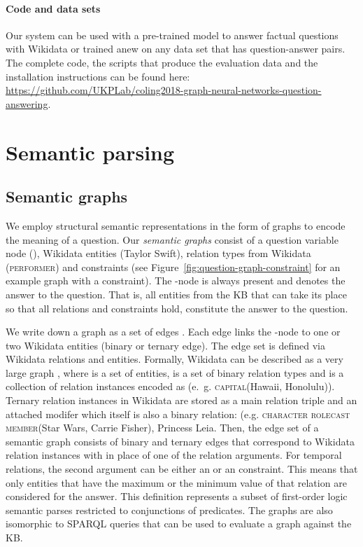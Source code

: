 \documentclass[11pt]{article}
\begin{document}
\paragraph{Code and data sets} 
Our system can be used with a pre-trained model to answer factual questions with Wikidata or trained anew on any data set that has question-answer pairs.
The complete code, the scripts that produce the evaluation data and the installation instructions can be found here: \url{https://github.com/UKPLab/coling2018-graph-neural-networks-question-answering}.


\section{Semantic parsing}

\subsection{Semantic graphs}

We employ structural semantic representations in the form of graphs to encode the meaning of a question. 
Our \textit{semantic graphs} consist of a question variable node (), Wikidata entities ({\small\sffamily Taylor Swift}), relation types from Wikidata (\textsc{performer}) and constraints (see Figure~\ref{fig:question-graph-constraint} for an example graph with a constraint). The -node is always present and denotes the answer to the question. That is, all entities from the KB that can take its place so that all relations and constraints hold, constitute the answer to the question. 

We write down a graph as a set of edges . Each edge links the -node to one or two Wikidata entities (binary or ternary edge). The edge set  is defined via Wikidata relations and entities. Formally, Wikidata can be described as a very large graph , where  is a set of entities,  is a set of binary relation types and  is a collection of relation instances encoded as  (e.~g. \textsc{capital}\hspace{0.1em}({\small\sffamily Hawaii}, {\small\sffamily Honolulu})). Ternary relation instances in Wikidata are stored as a main relation triple and an attached modifer which itself is also a binary relation:  (e.g. \textsc{character role}\hspace{0.1em}\textsc{cast member}\hspace{0.1em}({\small\sffamily Star Wars}, {\small\sffamily Carrie Fisher}), {\small\sffamily Princess Leia}. Then, the edge set  of a semantic graph consists of binary and ternary edges that correspond to Wikidata relation instances with  in place of one of the relation arguments. For temporal relations, the second argument can be either an  or an  constraint. This means that only entities that have the maximum or the minimum value of that relation are considered for the answer.
This definition represents a subset of first-order logic semantic parses restricted to conjunctions of predicates. The graphs are also isomorphic to SPARQL queries that can be used to evaluate a graph against the KB.
\end{document}

